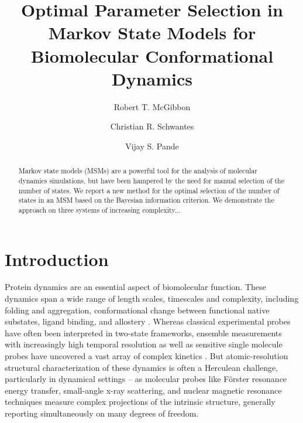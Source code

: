 \documentclass[twocolumn,floatfix,nofootinbib,aps]{revtex4-1}
\begin{document}
\title{Optimal Parameter Selection in Markov State Models for Biomolecular Conformational Dynamics}
\author{Robert T. McGibbon}
\author{Christian R. Schwantes}
\author{Vijay S. Pande}

\begin{abstract}
Markov state models (MSMs) are a powerful tool for the analysis of molecular dynamics simulations, but have been hampered by the need for manual selection of the number of states. We report a new method for the optimal selection of the number of states in an MSM based on the Bayesian information criterion. We demonstrate the approach on three systems of increasing complexity...
\end{abstract}

\maketitle

\section{Introduction}
Protein dynamics are an essential aspect of biomolecular function. These dynamics span a wide range of length scales, timescales and complexity, including folding and aggregation, conformational change between functional native substates, ligand binding, and allostery \cite{Dobson2003Protein, Kim2008Real, Austin1975Dynamics, Bahar2007Intrinsic}. Whereas classical experimental probes have often been interpreted in two-state frameworks, ensemble measurements with increasingly high temporal resolution as well as sensitive single molecule probes have uncovered a vast array of complex kinetics \cite{Cosa2006Evidence, Zhang2011Direct}. But atomic-resolution structural characterization of these dynamics is often a Herculean challenge, particularly in dynamical settings -- as molecular probes like F\"{o}rster resonance energy transfer, small-angle x-ray scattering, and nuclear magnetic resonance techniques measure complex projections of the intrinsic structure, generally reporting simultaneously on many degrees of freedom\cite{Mertens2010Structural, Tzeng2011Protein}.
\end{document}
